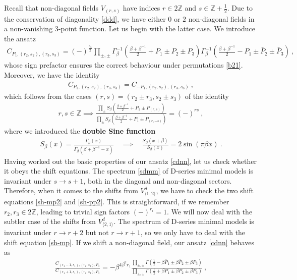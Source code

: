 \documentclass[12pt, a4paper]{article}
\newcommand{\myindex}[1]{\textbf{\boldmath #1}}
\theoremstyle{break}
\begin{document}
Recall that non-diagonal fields $V_{(r,s)}$ have indices $r\in 2\mathbb{Z}$ and $s\in\mathbb{Z}+\frac12$. 
Due to the conservation of diagonality \eqref{ddd}, we have either $0$ or $2$ non-diagonal fields in a non-vanishing 3-point function. Let us begin with the latter case. We introduce the ansatz 
\begin{align}
 \boxed{C_{P_1,(r_2,s_2),(r_3,s_3)} = (-)^{\frac{r_3}{2}}\prod_{\pm,\pm}
 \Gamma_\beta^{-1}\left(\tfrac{\beta+\beta^{-1}}{2}+P_1 \pm P_2\pm P_3\right) 
 \Gamma_\beta^{-1}\left(\tfrac{\beta+\beta^{-1}}{2}-P_1 \pm \bar P_2\pm \bar P_3\right)}\ ,
 \label{cdnn}
\end{align}
whose sign prefactor ensures the correct behaviour under permutations \eqref{b21}. Moreover, we have the identity
\begin{align}
 C_{P_1,(r_2,s_2),(r_3,s_3)}=C_{-P_1,(r_2,s_2),(r_3,s_3)} \ ,
 \label{cpcmp}
\end{align}
which follows from the cases $(r,s)=(r_2\pm r_3,s_2\pm s_3)$ of the identity 
\begin{align}
 r,s\in\mathbb{Z} \implies \frac{\prod_\pm S_\beta\left(\frac{\beta+\beta^{-1}}{2} +P_1 \pm P_{(r,s)}\right)}{\prod_\pm S_\beta\left(\frac{\beta+\beta^{-1}}{2} +P_1 \pm P_{(r,-s)}\right)} =(-)^{rs}\ ,
 \label{dsr}
\end{align}
where we introduced the \myindex{double Sine function}
\begin{align}
 S_\beta(x) = \frac{\Gamma_\beta(x)}{\Gamma_\beta(\beta + \beta^{-1}-x)}\quad \implies \quad \frac{S_\beta(x+\beta)}{S_\beta(x)} = 2\sin(\pi\beta x)\ .
 \label{sb}
\end{align}
Having worked out the basic properties of our ansatz \eqref{cdnn}, let us check whether it obeys the shift equations. The spectrum \eqref{sdmm} of D-series minimal models is invariant under $s\to s+1$, both in the diagonal and non-diagonal sectors. Therefore, when it comes to the shifts from $V^d_{\langle 1,2\rangle}$, we have to check the two shift equations \eqref{sh-mp2} and \eqref{sh-pp2}. This is straightforward, if we remember $r_2,r_3\in 2\mathbb{Z}$, leading to trivial sign factors $(-)^{r_i}=1$. We will now deal with the subtler case of the shifts from $V^d_{\langle 2,1\rangle}$. The spectrum of D-series minimal models is invariant under $r\to r+2$ but not $r\to r+1$, so we only have to deal with the shift equation \eqref{sh-mp}. If we shift a non-diagonal field, our ansatz \eqref{cdnn} behaves as 
\begin{align}
 \frac{C_{(r_1-1,s_1),(r_2,s_2),P_3}}{C_{(r_1+1,s_1),(r_2,s_2),P_3}} = - \beta^{4\beta^2r_1}\frac{\prod_{\pm,\pm} \Gamma(\frac12-\beta \bar P_1\pm \beta\bar P_2\pm \beta P_3)}{\prod_{\pm,\pm} \Gamma(\frac12+\beta P_1\pm \beta P_2\pm \beta P_3)}\ , 
\end{align}
\end{document}
